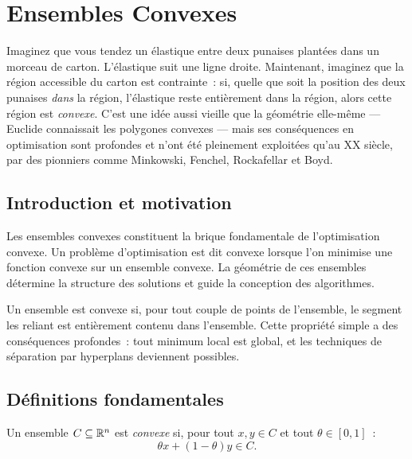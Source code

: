 \chapter{Ensembles Convexes}
\label{ch:ensembles}

Imaginez que vous tendez un \'elastique entre deux punaises plant\'ees dans
un morceau de carton. L'\'elastique suit une ligne droite. Maintenant,
imaginez que la r\'egion accessible du carton est contrainte~: si, quelle
que soit la position des deux punaises \emph{dans} la r\'egion, l'\'elastique
reste enti\`erement dans la r\'egion, alors cette r\'egion est
\emph{convexe}. C'est une id\'ee aussi vieille que la g\'eom\'etrie
elle-m\^eme --- Euclide connaissait les polygones convexes --- mais ses
cons\'equences en optimisation sont profondes et n'ont \'et\'e pleinement
exploit\'ees qu'au XX\ieme{} si\`ecle, par des pionniers comme
Minkowski, Fenchel, Rockafellar et Boyd.

\section{Introduction et motivation}

Les ensembles convexes constituent la brique fondamentale de l'optimisation convexe.
Un probl\`eme d'optimisation est dit convexe lorsque l'on minimise une fonction convexe
sur un ensemble convexe. La g\'eom\'etrie de ces ensembles d\'etermine la structure
des solutions et guide la conception des algorithmes.

\begin{intuition}
Un ensemble est convexe si, pour tout couple de points de l'ensemble, le segment
les reliant est enti\`erement contenu dans l'ensemble. Cette propri\'et\'e simple
a des cons\'equences profondes~: tout minimum local est global, et les techniques
de s\'eparation par hyperplans deviennent possibles.
\end{intuition}

\section{D\'efinitions fondamentales}

\begin{definition}
Un ensemble $C \subseteq \mathbb{R}^n$ est \emph{convexe} si, pour tout $x, y \in C$ et tout
$\theta \in [0,1]$~:
\[
    \theta x + (1-\theta)y \in C.
\]
\end{definition}

